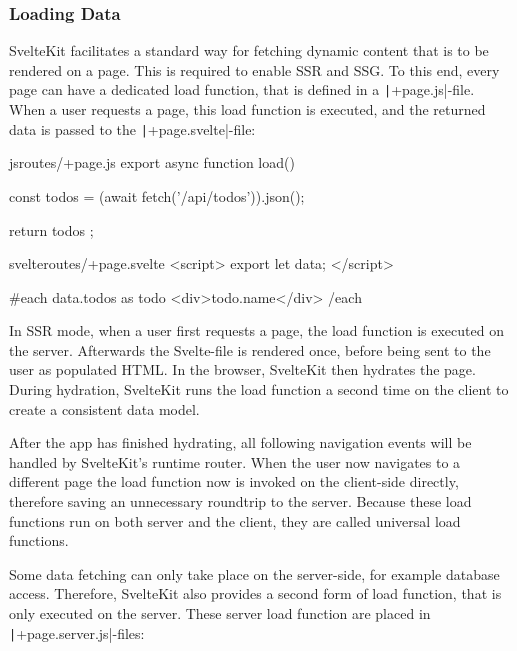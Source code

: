 \subsubsection{Loading Data}
\label{sec:sveltekit-loading}

SvelteKit facilitates a standard way for fetching dynamic content that is to be rendered on a page. This is required to enable SSR and SSG. To this end, every page can have a dedicated load function, that is defined in a \texttt|+page.js|-file. When a user requests a page, this load function is executed, and the returned data is passed to the \texttt|+page.svelte|-file:

\begin{myminted}{js}{routes/+page.js}
    export async function load() {
            const todos = (await fetch('/api/todos')).json();

            return { todos };
        }
\end{myminted}
\begin{myminted}{svelte}{routes/+page.svelte}
<script>
  export let data;
</script>

{#each data.todos as todo}
  <div>{todo.name}</div>
{/each}
\end{myminted}

In SSR mode, when a user first requests a page, the load function is executed on the server. Afterwards the Svelte-file is rendered once, before being sent to the user as populated HTML. In the browser, SvelteKit then hydrates the page. During hydration, SvelteKit runs the load function a second time on the client to create a consistent data model.

After the app has finished hydrating, all following navigation events will be handled by SvelteKit's runtime router. When the user now navigates to a different page the load function now is invoked on the client-side directly, therefore saving an unnecessary roundtrip to the server. Because these load functions run on both server and the client, they are called universal load functions.

Some data fetching can only take place on the server-side, for example database access. Therefore, SvelteKit also provides a second form of load function, that is only executed on the server. These server load function are placed in \texttt|+page.server.js|-files:

\s{$}

